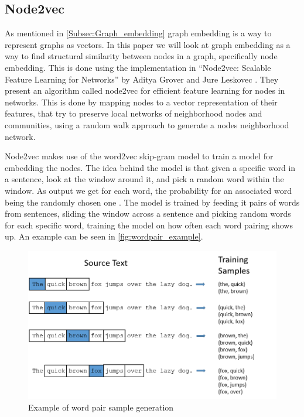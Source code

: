 \subsection{Node2vec}\label{Subsec:node2vec_prelim}
As mentioned in \autoref{Subsec:Graph_embedding} graph embedding is a way to represent graphs as vectors. In this paper we will look at graph embedding as a way to find structural similarity between nodes in a graph, specifically node embedding. This is done using the implementation in “Node2vec: Scalable Feature Learning for Networks” by Aditya Grover and Jure Leskovec \cite{Node2vec}. They present an algorithm called node2vec for efficient feature learning for nodes in networks. This is done by mapping nodes to a vector representation of their features, that try to preserve local networks of neighborhood nodes and communities, using a random walk approach to generate a nodes neighborhood network.

Node2vec makes use of the word2vec skip-gram model to train a model for embedding the nodes.
The idea behind the model is that given a specific word in a sentence, look at the window around it, and pick a random word within the window. As output we get for each word, the probability for an associated word being the randomly chosen one \cite{Word2vec}.
The model is trained by feeding it pairs of words from sentences, sliding the window across a sentence and picking random words for each specific word, training the model on how often each word pairing shows up. An example can be seen in \autoref{fig:wordpair_example}.

\begin{figure}[H]
\centering
  \includegraphics[scale=0.6]{Article/figures/training_data.png}
  \caption{Example of word pair sample generation \cite{Word2vec}}
  \label{fig:wordpair_example}
\end{figure}

